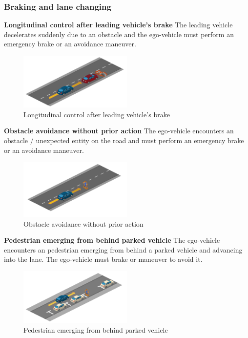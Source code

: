 \documentclass{article}
\begin{document}
\subsubsection{Braking and lane changing}
\textbf{Longitudinal control after leading vehicle’s brake}
The leading vehicle decelerates suddenly due to an obstacle and the ego-vehicle must perform an emergency brake or an avoidance maneuver.
\begin{figure}[h]
    \centering
    \includegraphics[width=0.5\textwidth]{img/TR02.png}
    \caption{Longitudinal control after leading vehicle’s brake} \label{Scenario_longgitudinalControl}
\end{figure}

\textbf{Obstacle avoidance without prior action}
The ego-vehicle encounters an obstacle / unexpected entity on the road and must perform an emergency brake or an avoidance maneuver.
\begin{figure}[h]
    \centering
    \includegraphics[width=0.5\textwidth]{img/TR03.png}
    \caption{Obstacle avoidance without prior action} \label{Scenario_obsAvoidanceWithout}
\end{figure}

\textbf{Pedestrian emerging from behind parked vehicle}
The ego-vehicle encounters an pedestrian emerging from behind a parked vehicle and advancing into the lane. The ego-vehicle must brake or maneuver to avoid it.
\begin{figure}[h]
    \centering
    \includegraphics[width=0.5\textwidth]{img/TR17.png}
    \caption{Pedestrian emerging from behind parked vehicle} \label{Scenario_pedestrianEmerging}
\end{figure}
\end{document}
